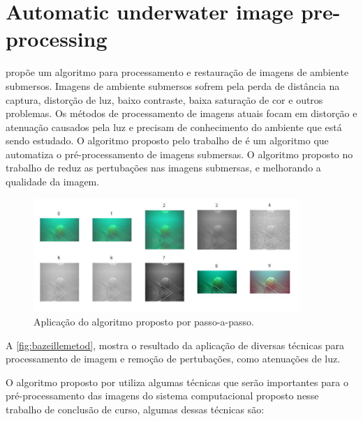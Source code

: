 \section{Automatic underwater image pre-processing}

 propõe um algoritmo para processamento e restauração de imagens de ambiente submersos.  Imagens de ambiente submersos sofrem pela perda de distância na captura, distorção de luz, baixo contraste, baixa saturação de cor e outros problemas. Os métodos de processamento de imagens atuais focam em distorção e atenuação causados pela luz e precisam de conhecimento do ambiente que está sendo estudado. O algoritmo proposto pelo trabalho de  é um algoritmo que automatiza o pré-processamento de imagens submersas. O algoritmo proposto no trabalho de  reduz as pertubações nas imagens submersas, e melhorando a qualidade da imagem.


\begin{figure}[h]
	\caption{\label{fig:bazeillemetod}Aplicação do algoritmo proposto por \cite{bazeille2006} passo-a-passo.}
	\begin{center}
	    \includegraphics[width=0.9\textwidth]{resources/bazeilemetod}
	\end{center}
\end{figure}

A \autoref{fig:bazeillemetod}, mostra o resultado da aplicação de diversas técnicas para processamento de imagem e remoção de pertubações, como atenuações de luz.

O algoritmo proposto por \cite{bazeille2006} utiliza algumas técnicas que serão importantes para o pré-processamento das imagens do sistema computacional proposto nesse trabalho de conclusão de curso, algumas dessas técnicas são:

